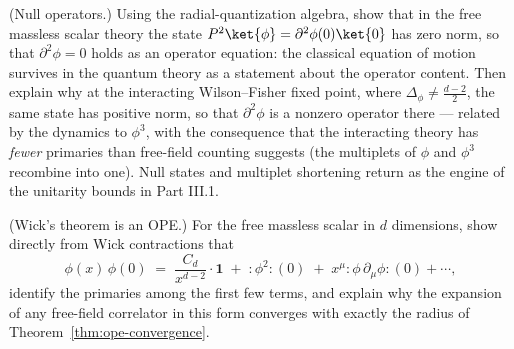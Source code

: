 \begin{exercise}[medium]
\label{exr:null-operators}
(Null operators.) Using the radial-quantization algebra, show that in the
free massless scalar theory the state $P^2\ket{\phi} =
\partial^2\phi(0)\ket{0}$ has zero norm, so that $\partial^2\phi = 0$ holds
as an operator equation: the classical equation of motion survives in the
quantum theory as a statement about the operator content. Then explain why
at the interacting Wilson--Fisher fixed point, where $\Delta_\phi \neq
\frac{d-2}{2}$, the same state has positive norm, so that $\partial^2\phi$
is a nonzero operator there --- related by the dynamics to $\phi^3$, with
the consequence that the interacting theory has \emph{fewer} primaries than
free-field counting suggests (the multiplets of $\phi$ and $\phi^3$
recombine into one). Null states and multiplet shortening return as the
engine of the unitarity bounds in Part III.1.
\end{exercise}

\begin{exercise}[easy]
\label{exr:free-ope}
(Wick's theorem is an OPE.) For the free massless scalar in $d$ dimensions,
show directly from Wick contractions that
\begin{equation*}
\phi(x)\,\phi(0) \;=\; \frac{C_d}{x^{d-2}}\cdot \mathbf{1}
\;+\; :\!\phi^2\!:(0) \;+\; x^\mu :\!\phi\,\partial_\mu \phi\!:(0) + \cdots,
\end{equation*}
identify the primaries among the first few terms, and explain why the
expansion of any free-field correlator in this form converges with exactly
the radius of Theorem~\ref{thm:ope-convergence}.
\end{exercise}

